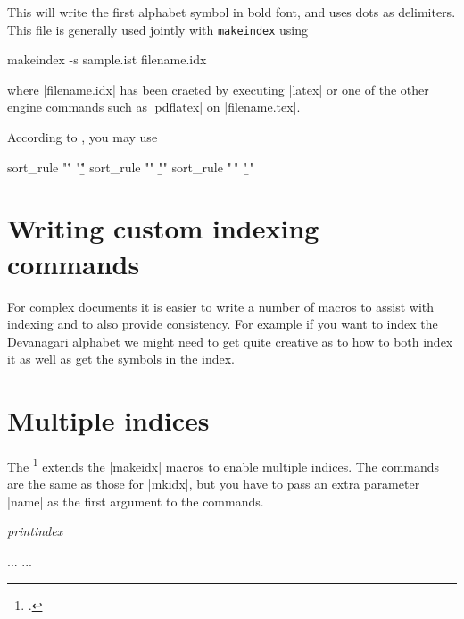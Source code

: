 This will write the first alphabet symbol in bold font, and uses dots as delimiters. This file is generally  used jointly with \texttt{makeindex} using

\begin{teX}
makeindex -s sample.ist filename.idx
\end{teX}

where |filename.idx| has been craeted by executing |latex| or one of the other engine commands such as |pdflatex| on |filename.tex|.


According to , you may use

\begin{teX}
sort_rule "\." "\b\."
sort_rule "\:" "\b\:"
sort_rule "\," "\b\,"
\end{teX}


\section{Writing custom indexing commands}

For complex documents it is easier to write a number of macros to assist with indexing and to also provide consistency. For example if you want to index the Devanagari alphabet we might need to get quite creative as to how to both index it as well as get the symbols in the index.

%
%
%

\section{Multiple indices}

The \footcite{multind} extends the |makeidx| macros to enable multiple indices. The commands are the same as those for |mkidx|, but you have to pass an extra parameter |name| as the first argument to the commands.

\emph{printindex}
\begin{phdverbatim}
\usepackage{multind}
...
...
\end{phdverbatim}

